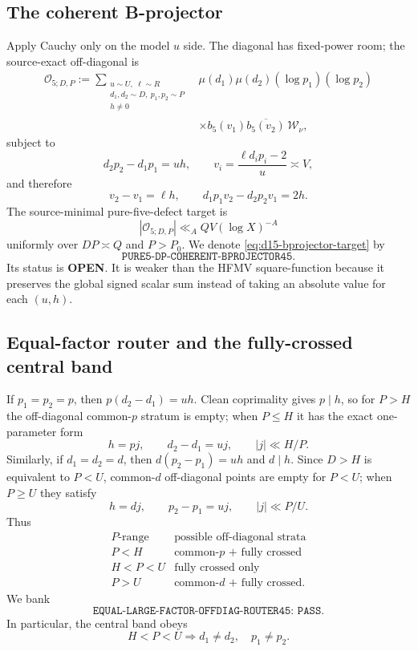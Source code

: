 \documentclass[11pt]{article}
\theoremstyle{definition}
\newcommand{\1}{\mathbf 1}
\begin{document}
\subsection{The coherent B-projector}
Apply Cauchy only on the model $u$ side.  The diagonal has fixed-power room;
the source-exact off-diagonal is
\begin{equation}
\boxed{
\begin{aligned}
 \mathcal O_{5;D,P}:=
 \sum_{\substack{u\sim U,\ \ell\sim R\\
                 d_1,d_2\sim D,\ p_1,p_2\sim P\\h\ne0}}
 &\mu(d_1)\mu(d_2)(\log p_1)(\log p_2)\\
 &\times b_5(v_1)\overline{b_5(v_2)}\,\mathcal W_\nu,
\end{aligned}}
\label{eq:d15-bprojector}
\end{equation}
subject to
\begin{equation}
 \boxed{d_2p_2-d_1p_1=uh,}
 \qquad
 \boxed{v_i=\frac{\ell d_ip_i-2}{u}\asymp V,}
 \label{eq:d15-coupled-shifts}
\end{equation}
and therefore
\[
 \boxed{v_2-v_1=\ell h},\qquad
 \boxed{d_1p_1v_2-d_2p_2v_1=2h}.
\]
The source-minimal pure-five-defect target is
\begin{equation}
 \boxed{|\mathcal O_{5;D,P}|\ll_A QV(\log X)^{-A}}
 \label{eq:d15-bprojector-target}
\end{equation}
uniformly over $DP\asymp Q$ and $P>P_0$.  We denote
\eqref{eq:d15-bprojector-target} by
\[
 \boxed{\texttt{PURE5-DP-COHERENT-BPROJECTOR45}}.
\]
Its status is \textbf{OPEN}.  It is weaker than the HFMV square-function
because it preserves the global signed scalar sum instead of taking an
absolute value for each $(u,h)$.

\subsection{Equal-factor router and the fully-crossed central band}
If $p_1=p_2=p$, then $p(d_2-d_1)=uh$.  Clean coprimality gives $p\mid h$, so
for $P>H$ the off-diagonal common-$p$ stratum is empty; when $P\le H$ it has
the exact one-parameter form
\[
 h=pj,\qquad d_2-d_1=uj,\qquad |j|\ll H/P.
\]
Similarly, if $d_1=d_2=d$, then $d(p_2-p_1)=uh$ and $d\mid h$.  Since
$D>H$ is equivalent to $P<U$, common-$d$ off-diagonal points are empty for
$P<U$; when $P\ge U$ they satisfy
\[
 h=dj,\qquad p_2-p_1=uj,\qquad |j|\ll P/U.
\]
Thus
\[
\begin{array}{c|c}
P\text{-range}&\text{possible off-diagonal strata}\\ \hline
P<H&\text{common-$p$ + fully crossed}\\
H<P<U&\text{fully crossed only}\\
P>U&\text{common-$d$ + fully crossed}.
\end{array}
\]
We bank
\[
 \boxed{\texttt{EQUAL-LARGE-FACTOR-OFFDIAG-ROUTER45: PASS}}.
\]
In particular, the central band obeys
\[
 \boxed{H<P<U\Longrightarrow d_1\ne d_2,\quad p_1\ne p_2.}
\]
\end{document}
